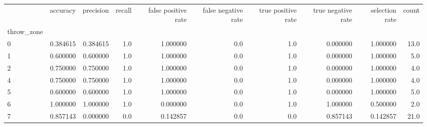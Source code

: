 \begin{tabular}{lrrrrrrrrr}
\toprule
{} &  accuracy &  precision &  recall &  false positive rate &  false negative rate &  true positive rate &  true negative rate &  selection rate &  count \\
throw\_zone &           &            &         &                      &                      &                     &                     &                 &        \\
\midrule
0          &  0.384615 &   0.384615 &     1.0 &             1.000000 &                  0.0 &                 1.0 &            0.000000 &        1.000000 &   13.0 \\
1          &  0.600000 &   0.600000 &     1.0 &             1.000000 &                  0.0 &                 1.0 &            0.000000 &        1.000000 &    5.0 \\
2          &  0.750000 &   0.750000 &     1.0 &             1.000000 &                  0.0 &                 1.0 &            0.000000 &        1.000000 &    4.0 \\
4          &  0.750000 &   0.750000 &     1.0 &             1.000000 &                  0.0 &                 1.0 &            0.000000 &        1.000000 &    4.0 \\
5          &  0.600000 &   0.600000 &     1.0 &             1.000000 &                  0.0 &                 1.0 &            0.000000 &        1.000000 &    5.0 \\
6          &  1.000000 &   1.000000 &     1.0 &             0.000000 &                  0.0 &                 1.0 &            1.000000 &        0.500000 &    2.0 \\
7          &  0.857143 &   0.000000 &     0.0 &             0.142857 &                  0.0 &                 0.0 &            0.857143 &        0.142857 &   21.0 \\
\bottomrule
\end{tabular}
